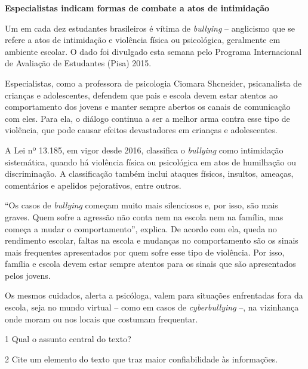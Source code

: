 \begin{myquote}

\textbf{Especialistas indicam formas de combate a atos de intimidação}

Um em cada dez estudantes brasileiros é vítima de \textit{bullying} -- anglicismo
que se refere a atos de intimidação e violência física ou psicológica,
geralmente em ambiente escolar. O dado foi divulgado esta semana pelo
Programa Internacional de Avaliação de Estudantes (Pisa) 2015.

Especialistas, como a professora de psicologia Ciomara Shcneider,
psicanalista de crianças e adolescentes, defendem que pais e escola
devem estar atentos ao comportamento dos jovens e manter sempre abertos
os canais de comunicação com eles. Para ela, o diálogo continua a ser a
melhor arma contra esse tipo de violência, que pode causar efeitos
devastadores em crianças e adolescentes.

A Lei nº 13.185, em vigor desde 2016, classifica o \textit{bullying} como
intimidação sistemática, quando há violência física ou psicológica em
atos de humilhação ou discriminação. A classificação também inclui
ataques físicos, insultos, ameaças, comentários e apelidos pejorativos,
entre outros.

``Os casos de \textit{bullying} começam muito mais silenciosos e, por isso, são
mais graves. Quem sofre a agressão não conta nem na escola nem na
família, mas começa a mudar o comportamento'', explica. De acordo com
ela, queda no rendimento escolar, faltas na escola e mudanças no
comportamento são os sinais mais frequentes apresentados por quem sofre
esse tipo de violência. Por isso, família e escola devem estar sempre
atentos para os sinais que são apresentados pelos jovens.

Os mesmos cuidados, alerta a psicóloga, valem para situações enfrentadas
fora da escola, seja no mundo virtual -- como em casos de \textit{cyberbullying}
--, na vizinhança onde moram ou nos locais que costumam frequentar.


\end{myquote}

\num{1} Qual o assunto central do texto?


\num{2} Cite um elemento do texto que traz maior confiabilidade às informações.

